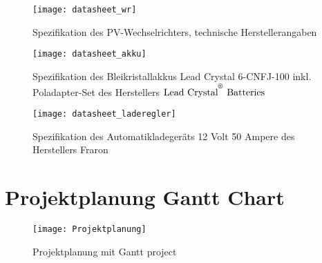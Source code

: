   \begin{figure}[h] 
      \centering
      \texttt{[image: datasheet\_wr]}
      \caption{Spezifikation des PV-Wechselrichters, technische Herstellerangaben \cite{spec_SMA}} 
      \label{Abb:datasheet_wr}
  \end{figure} 	

  \begin{figure}[h] 
      \centering
      \texttt{[image: datasheet\_akku]}
      \caption{Spezifikation des Bleikristallakkus Lead Crystal 6-CNFJ-100 inkl. Poladapter-Set des Herstellers $\text{Lead Crystal}^{\textsuperscript{\textregistered}} ~\text{Batteries}$ \cite{spec_battery_buffer}}   
      \label{Abb:datasheet_akku}
  \end{figure} 	

  \begin{figure}[h] 
      \centering
      \texttt{[image: datasheet\_laderegler]}
      \caption{Spezifikation des Automatikladegeräts 12 Volt 50 Ampere des Herstellers Fraron \cite{spec_laderegler}} 
      \label{Abb:datasheet_laderegler}
  \end{figure} 	

\section{Projektplanung Gantt Chart}
\begin{landscape}
  \begin{figure}[h] 
      \centering
      \texttt{[image: Projektplanung]}
      \caption{Projektplanung mit Gantt project}
      \label{Abb:gantt}
  \end{figure} 	
\end{landscape}